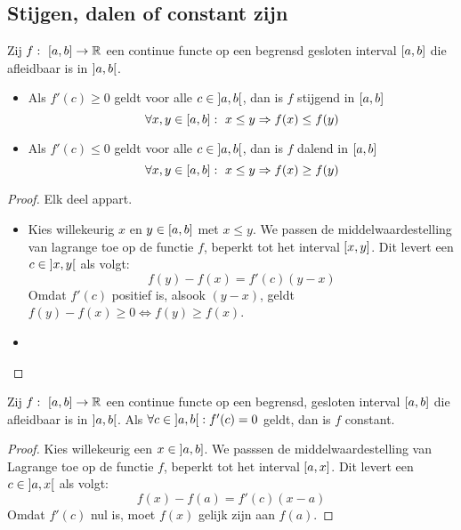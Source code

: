 \documentclass[main.tex]{subfiles}
\begin{document}
\subsection{Stijgen, dalen of constant zijn}

\begin{bpr}
  Zij $f:\ \interval{a}{b} \rightarrow \mathbb{R}$ een continue functe op een begrensd gesloten interval $\interval{a}{b}$ die afleidbaar is in $\interval[open]{a}{b}$.
  \begin{itemize}
  \item Als $f'(c) \ge 0$ geldt voor alle $c \in \interval[open]{a}{b}$, dan is $f$ stijgend in $\interval{a}{b}$
    \[ \forall x,y \in \interval{a}{b}:\ x \le y \Rightarrow f(x) \le f(y) \]
  \item Als $f'(c) \le 0$ geldt voor alle $c \in \interval[open]{a}{b}$, dan is $f$ dalend in $\interval{a}{b}$
    \[ \forall x,y \in \interval{a}{b}:\ x \le y \Rightarrow f(x) \ge f(y) \]
  \end{itemize}

  \begin{proof}
    Elk deel appart.
    \begin{itemize}
    \item Kies willekeurig $x$ en $y \in \interval{a}{b}$ met $x\le y$.
      We passen de middelwaardestelling van lagrange toe op de functie $f$, beperkt tot het interval $\interval{x}{y}$.
      Dit levert een $c\in \interval[open]{x}{y}$ als volgt:
      \[ f(y)-f(x) = f'(c)(y-x) \]
      Omdat $f'(c)$ positief is, alsook $(y-x)$, geldt $f(y)-f(x) \ge 0 \Leftrightarrow f(y) \ge f(x)$.
    \item {}
    \end{itemize}
  \end{proof}
\end{bpr}

\begin{bpr}
  Zij $f:\ \interval{a}{b} \rightarrow \mathbb{R}$ een continue functe op een begrensd, gesloten interval $\interval{a}{b}$ die afleidbaar is in $\interval[open]{a}{b}$.
  Als $\forall c\in \interval[open]{a}{b}: f'(c) = 0$ geldt, dan is $f$ constant.

  \begin{proof}
    Kies willekeurig een $x\in \interval[open left]{a}{b}$.
    We passsen de middelwaardestelling van Lagrange toe op de functie $f$, beperkt tot het interval $\interval{a}{x}$.
    Dit levert een $c\in \interval[open]{a}{x}$ als volgt:
    \[ f(x)-f(a) = f'(c)(x-a) \]
    Omdat $f'(c)$ nul is, moet $f(x)$ gelijk zijn aan $f(a)$.
  \end{proof}
\end{bpr}
\end{document}
